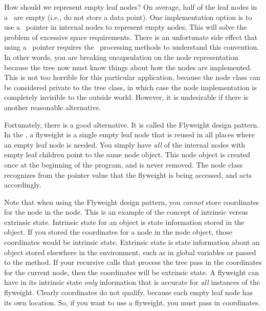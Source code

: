 How should we represent empty leaf nodes?
On average, half of the leaf nodes in a \PRquad\ are empty
(i.e., do not store a data point). 
One implementation option is to use a \NULL\ pointer in internal
nodes to represent empty nodes.
This will solve the problem of excessive space requirements.
There is an unfortunate side effect that using a \NULL\ pointer requires
the \PRquad\ processing methods to understand this convention.
In other words, you are breaking encapsulation on the node
representation because the tree now must know things about how the
nodes are implemented.
This is not too horrible for this particular application, because the
node class can be considered private to the tree class, in which case
the node implementation is completely invisible to the outside world.
However, it is undesirable if there is another reasonable alternative.

Fortunately, there is a good alternative.
It is called the Flyweight design pattern.
In the \PRquad, a flyweight is a single empty leaf node that
is reused in all places where an empty leaf node is needed.
You simply have \emph{all} of the internal nodes with empty leaf
children point to the same node object.
This node object is created once at the beginning of the program,
and is never removed.
The node class recognizes from the pointer value that the flyweight is
being accessed, and acts accordingly.

Note that when using the Flyweight design pattern, you \emph{cannot}
store coordinates for the node in the node.
This is an example of the concept of intrinsic versus extrinsic state.
Intrinsic state for an object is state information stored in the object.
If you stored the coordinates for a node in the node object, those
coordinates would be intrinsic state.
Extrinsic state is state information about an object stored elsewhere
in the environment, such as in global variables or passed to the
method.
If your recursive calls that process the tree pass in the coordinates
for the current node, then the coordinates will be extrinsic state.
A flyweight can have in its intrinsic state \emph{only}
information that is accurate for \emph{all} instances of the flyweight.
Clearly coordinates do not qualify, because each empty
leaf node has its own location.
So, if you want to use a flyweight, you must pass in coordinates.

